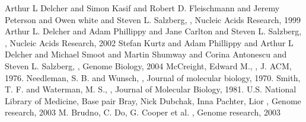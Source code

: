 \documentclass[twocolumn,twoside]{Jornadas}
\begin{document}
\nocite{*}

\begin{thebibliography}{1}
   Arthur L Delcher and Simon Kasif and Robert D. Fleischmann and Jeremy
    Peterson and Owen white and Steven L. Salzberg,
   ,
   \newblock Nucleic Acids Research, 1999
   Arthur L. Delcher and Adam Phillippy and Jane Carlton and Steven
    L. Salzberg,
   ,
   \newblock Nucleic Acids Research, 2002
   Stefan Kurtz and Adam Phillippy and Arthur L Delcher and Michael
    Smoot and Martin Shumway and Corina Antonescu and Steven L. Salzberg,
   ,
   \newblock Genome Biology, 2004
   McCreight, Edward M.,
   ,
   \newblock J. ACM, 1976.
   Needleman, S. B. and Wunsch,
   ,
   \newblock Journal of molecular biology, 1970.
   Smith, T. F. and Waterman, M. S.,
   ,
   \newblock Journal of Molecular Biology, 1981.
   U.S. National Library of Medicine,
   \newblock Base pair
   Bray, Nick Dubchak, Inna Pachter, Lior
   ,
   \newblock Genome research, 2003
   M. Brudno, C. Do, G. Cooper et al.
   ,
   \newblock Genome research, 2003
\end{thebibliography}
\end{document}

